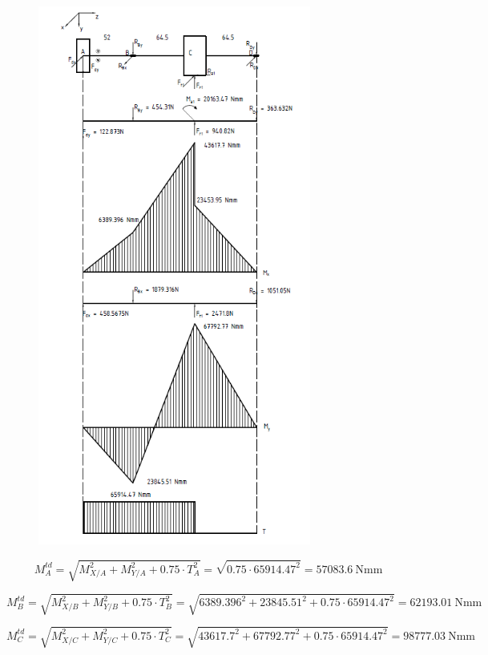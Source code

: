 \begin{figure}[H]
    \centering
    \includegraphics[width=0.8\textwidth]{pictures/momen1.png}
\end{figure}
\[
    M_A^{td} 
    = \sqrt{M_{X/A}^2 + M_{Y/A}^2 + 0.75 \cdot T_A^2} 
    = \sqrt{0.75 \cdot 65914.47^2}  
    = 57083.6\ \text{Nmm}
\]

\[
    M_B^{td} 
    = \sqrt{M_{X/B}^2 + M_{Y/B}^2 + 0.75 \cdot T_B^2} 
    = \sqrt{6389.396^2 + 23845.51^2 + 0.75 \cdot 65914.47^2} 
    = 62193.01\ \text{Nmm}
\]

\[
    M_C^{td} 
    = \sqrt{M_{X/C}^2 + M_{Y/C}^2 + 0.75 \cdot T_C^2} 
    = \sqrt{43617.7^2 + 67792.77^2 + 0.75 \cdot 65914.47^2} 
    = 98777.03\ \text{Nmm}
\]

